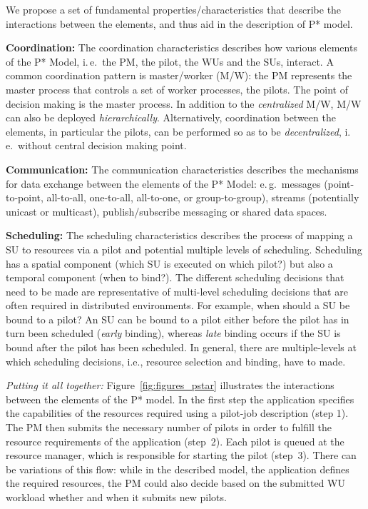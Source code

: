 \documentclass[conference,final]{IEEEtran}
\newcommand{\jhanote}[1]{ {\textcolor{red} { ***shantenu: #1 }}}
\newcommand{\alnote}[1]{ {\textcolor{blue} { ***andre: #1 }}}
\newcommand{\alnote}[1]{}
\newcommand{\jhanote}[1]{}
\begin{document}
We propose a set of fundamental properties/characteristics that
describe the interactions between the elements, and thus aid in the
description of P* model.


\textbf{Coordination:} The coordination characteristics describes how
various elements of the P* Model, i.\,e.\ the PM, the pilot, the WUs
and the SUs, interact. A common coordination pattern is master/worker
(M/W): the PM represents the master process that controls a set of
worker processes, the pilots. The point of decision making is the
master process. In addition to the \emph{centralized} M/W, M/W can
also be deployed \emph{hierarchically}.  Alternatively, coordination
between the elements, in particular the pilots, can be performed so as
to be \emph{decentralized}, i.\,e.\ without central decision making
point.

%

\textbf{Communication:} The communication characteristics describes the
mechanisms for data exchange between the elements of the P* Model:
e.\,g.\ messages (point-to-point, all-to-all, one-to-all, all-to-one,
or group-to-group), streams (potentially unicast or multicast),
publish/subscribe messaging or shared data spaces.
		
\textbf{Scheduling:} The scheduling characteristics describes the
process of mapping a SU to resources via a pilot and potential
multiple levels of scheduling. Scheduling has a spatial component
(which SU is executed on which pilot?) but also a temporal component
(when to bind?). The different scheduling decisions that need to be
made are representative of multi-level scheduling decisions that are
often required in distributed environments.  For example, when should
a SU be bound to a pilot?  An SU can be bound to a pilot either before
the pilot has in turn been scheduled ({\it early} binding), whereas
{\it late} binding occurs if the SU is bound after the pilot has been
scheduled.  In general, there are multiple-levels at which scheduling
decisions, i.e., resource selection and binding, have to made.

{\it Putting it all together:} 
Figure~\ref{fig:figures_pstar} illustrates the interactions between the elements
of the P* model. In the first step the application specifies the capabilities of
the resources required using a pilot-job description (step 1). The PM then
submits the necessary number of pilots in order to fulfill the resource
requirements of the application (step~2). Each pilot is queued at the resource
manager, which is responsible for starting the pilot (step~3). There can be
variations of this flow: while in the described model, the application defines
the required resources, the PM could also decide based
on the submitted WU workload whether and when it submits new pilots.
\end{document}
